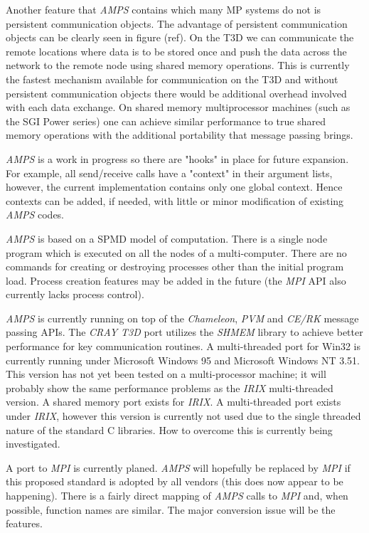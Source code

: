 Another feature that {\em AMPS} contains which many MP systems do not
is persistent communication objects.  The advantage of persistent
communication objects can be clearly seen in figure (ref).  On the T3D
we can communicate the remote locations where data is to be stored
once and push the data across the network to the remote node using
shared memory operations.  This is currently the fastest mechanism
available for communication on the T3D and without persistent
communication objects there would be additional overhead involved with
each data exchange.  On shared memory multiprocessor machines (such as
the SGI Power series) one can achieve similar performance to true
shared memory operations with the additional portability that message
passing brings.

{\em AMPS} is a work in progress so there are "hooks" in place for
future expansion.  For example, all send/receive calls have a "context"
in their argument lists, however, the current implementation contains
only one global context.  Hence contexts can be added, if needed, with
little or minor modification of existing {\em AMPS} codes.

{\em AMPS} is based on a SPMD model of computation.  There is a single
node program which is executed on all the nodes of a multi-computer.
There are no commands for creating or destroying processes other than
the initial program load.  Process creation features may be added in the
future (the {\em MPI} API also currently lacks process control).

{\em AMPS} is currently running on top of the {\em Chameleon}, {\em
PVM} and {\em CE/RK} message passing APIs.  The {\em CRAY T3D} port
utilizes the {\em SHMEM} library to achieve better performance for key
communication routines.  A multi-threaded port for Win32 is currently
running under Microsoft Windows 95 and Microsoft Windows NT 3.51.
This version has not yet been tested on a multi-processor machine; it
will probably show the same performance problems as the {\em IRIX}
multi-threaded version. A shared memory port exists for {\em IRIX}.  A
multi-threaded port exists under {\em IRIX}, however this version is
currently not used due to the single threaded nature of the standard C
libraries.  How to overcome this is currently being investigated.

A port to {\em MPI} is currently planed.  {\em AMPS} will hopefully be
replaced by {\em MPI} if this proposed standard is adopted by all
vendors (this does now appear to be happening).  There is a fairly
direct mapping of {\em AMPS} calls to {\em MPI} and, when possible,
function names are similar.  The major conversion issue will be the
 features.

